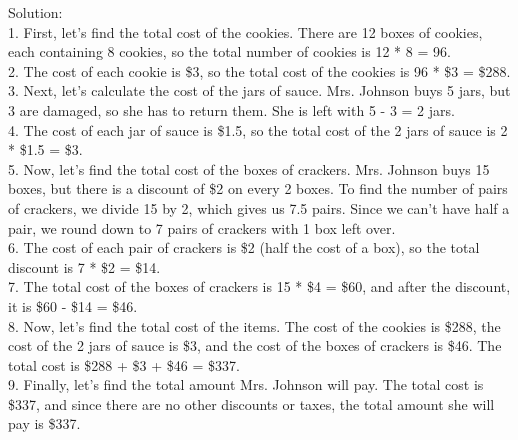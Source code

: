 \begin{tcolorbox}[breakable,boxrule=0.5pt,sharp corners,fontupper=\small,
colback=red!10, colframe=red!50!black, title={Failure: Overcomplicated Math Word Problem}]
Solution:\\
1. First, let's find the total cost of the cookies. There are 12 boxes of cookies, each containing 8 cookies, so the total number of cookies is 12 * 8 = 96.\\
2. The cost of each cookie is \$3, so the total cost of the cookies is 96 * \$3 = \$288.\\
3. Next, let's calculate the cost of the jars of sauce. Mrs. Johnson buys 5 jars, but 3 are damaged, so she has to return them. She is left with 5 - 3 = 2 jars.\\
4. The cost of each jar of sauce is \$1.5, so the total cost of the 2 jars of sauce is 2 * \$1.5 = \$3.\\
5. Now, let's find the total cost of the boxes of crackers. Mrs. Johnson buys 15 boxes, but there is a discount of \$2 on every 2 boxes. To find the number of pairs of crackers, we divide 15 by 2, which gives us 7.5 pairs. Since we can't have half a pair, we round down to 7 pairs of crackers with 1 box left over.\\
6. The cost of each pair of crackers is \$2 (half the cost of a box), so the total discount is 7 * \$2 = \$14.\\
7. The total cost of the boxes of crackers is 15 * \$4 = \$60, and after the discount, it is \$60 - \$14 = \$46.\\
8. Now, let's find the total cost of the items. The cost of the cookies is \$288, the cost of the 2 jars of sauce is \$3, and the cost of the boxes of crackers is \$46. The total cost is \$288 + \$3 + \$46 = \$337.\\
9. Finally, let's find the total amount Mrs. Johnson will pay. The total cost is \$337, and since there are no other discounts or taxes, the total amount she will pay is \$337.
\end{tcolorbox}

